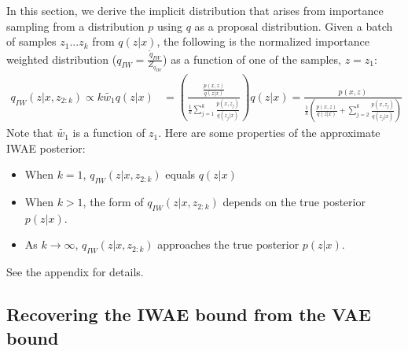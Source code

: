 \documentclass{article} %
\begin{document}

In this section, we derive the implicit distribution that arises from importance sampling from a distribution $p$ using $q$ as a proposal distribution. Given a batch of samples $z_{1}...z_{k}$ from $q(z|x)$, the following is the normalized importance weighted distribution ($q_{IW}=\frac{\tilde{q}_{IW}}{Z_{{q}_{IW}}}$) as a function of one of the samples, $z=z_{1}$:
\begin{align} 
    q_{IW}(z|x,z_{2:k}) \propto k \tilde{w_1} q(z|x)
    & = \left( \frac{ \frac{p(x,z)}{q(z|x)}}{  \frac{1}{k}   \sum_{j=1}^k \frac{p(x,z_j)}{q(z_j|x)}}  \right) q(z|x)
    = \frac{p(x,z)}{\frac{1}{k} \left(  \frac{p(x,z)}{q(z|x)}+ \sum_{j=2}^k \frac{p(x,z_j)}{q(z_j|x)} \right)} 
\label{eq:qiw}
\end{align}
Note that $\tilde{w_1}$ is a function of $z_1$.
Here are some properties of the approximate IWAE posterior: %
\begin{itemize}
    \item When $k=1$, $q_{IW}(z|x,z_{2:k})$ equals $q(z|x)$
    \item When $k > 1$, the form of $q_{IW}(z|x,z_{2:k})$ depends on the true posterior $p(z|x)$.
    \item As $k \rightarrow \infty$, $q_{IW}(z|x,z_{2:k})$ approaches the true posterior $p(z|x)$.
\end{itemize}
See the appendix for details.



\subsection{Recovering the IWAE bound from the VAE bound}
\end{document}
